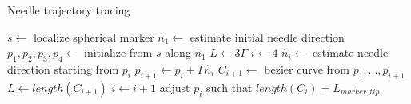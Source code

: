 \documentclass[letterpaper, 11 pt, conference]{ieeeconf} %
\begin{document}

\begin{algorithm}
\caption{Needle trajectory tracing}
\begin{algorithmic}
  \STATE $s\leftarrow$ localize spherical marker
  \STATE $\hat{n}_1 \leftarrow$ estimate initial needle direction
  \STATE $p_1, p_2, p_3, p_4 \leftarrow$ initialize from $s$ along $\hat{n}_1$
  \STATE $L\leftarrow 3\Gamma$ 
  \STATE $i\leftarrow 4$
    \STATE $\hat{n}_{i} \leftarrow$ estimate needle direction starting from $p_i$
    \STATE $p_{i+1} \leftarrow p_i + \Gamma \hat{n}_{i}$
    \STATE $C_{i+1}\leftarrow$ bezier curve from $p_1, ..., p_{i+1}$
    \STATE $L\leftarrow length(C_{i+1})$ 
    \STATE $i\leftarrow i+1$
  \ENDWHILE
  \STATE adjust $p_i$ such that $length(C_i) = L_{marker,tip}$
\end{algorithmic}
\end{algorithm}
\end{document}
